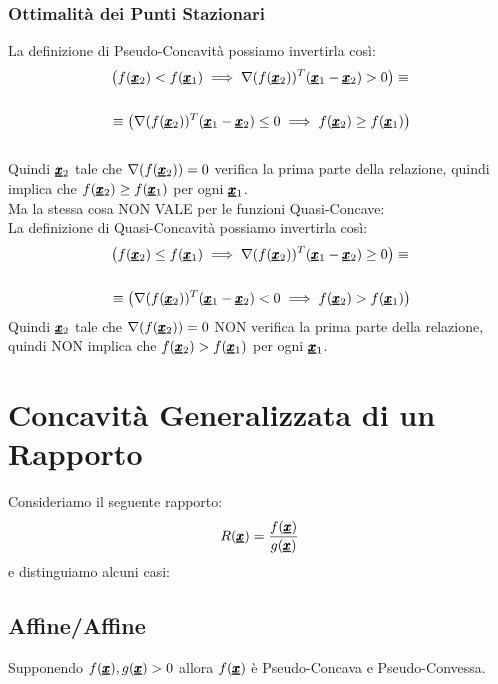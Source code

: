 \subsubsection{Ottimalità dei Punti Stazionari}
La definizione di Pseudo-Concavità possiamo invertirla così:
\begin{equation*}
    \begin{aligned}
    &\left(f(\pmb{\underline{x}}_2) < f(\pmb{\underline{x}}_1) \implies \nabla(f(\pmb{\underline{x}}_2))^T (\pmb{\underline{x}}_1 - \pmb{\underline{x}}_2) > 0 \right) \equiv \\ \\
    &\equiv \left(\nabla(f(\pmb{\underline{x}}_2))^T (\pmb{\underline{x}}_1 - \pmb{\underline{x}}_2) \leq 0 \implies f(\pmb{\underline{x}}_2) \geq f(\pmb{\underline{x}}_1) \right) 
    \end{aligned}
\end{equation*}
\\
Quindi $\pmb{\underline{x}}_2$ tale che $\nabla(f(\pmb{\underline{x}}_2)) = 0$ verifica la prima parte della relazione, quindi implica che $f(\pmb{\underline{x}}_2) \geq f(\pmb{\underline{x}}_1)$ per ogni $\pmb{\underline{x}}_1$.\\
\vspace{10pt}
Ma la stessa cosa NON VALE per le funzioni Quasi-Concave:\\ 
La definizione di Quasi-Concavità possiamo invertirla così:
\begin{equation*}
    \begin{aligned}
    &\left(f(\pmb{\underline{x}}_2) \leq f(\pmb{\underline{x}}_1) \implies \nabla(f(\pmb{\underline{x}}_2))^T (\pmb{\underline{x}}_1 - \pmb{\underline{x}}_2) \geq 0 \right) \equiv \\ \\
    &\equiv \left(\nabla(f(\pmb{\underline{x}}_2))^T (\pmb{\underline{x}}_1 - \pmb{\underline{x}}_2) < 0 \implies f(\pmb{\underline{x}}_2) > f(\pmb{\underline{x}}_1) \right) 
    \end{aligned}
\end{equation*}
Quindi $\pmb{\underline{x}}_2$ tale che $\nabla(f(\pmb{\underline{x}}_2)) = 0$ NON verifica la prima parte della relazione, quindi NON implica che $f(\pmb{\underline{x}}_2) > f(\pmb{\underline{x}}_1)$ per ogni $\pmb{\underline{x}}_1$.

\section{Concavità Generalizzata di un Rapporto}
Consideriamo il seguente rapporto:
\begin{equation*}
    R(\pmb{\underline{x}}) = \frac{f(\pmb{\underline{x}})}{g(\pmb{\underline{x}})}
\end{equation*}
e distinguiamo alcuni casi:
\subsection{Affine/Affine}
Supponendo $f(\pmb{\underline{x}}), g(\pmb{\underline{x}}) >0$ allora $f(\pmb{\underline{x}})$ è Pseudo-Concava e Pseudo-Convessa.

